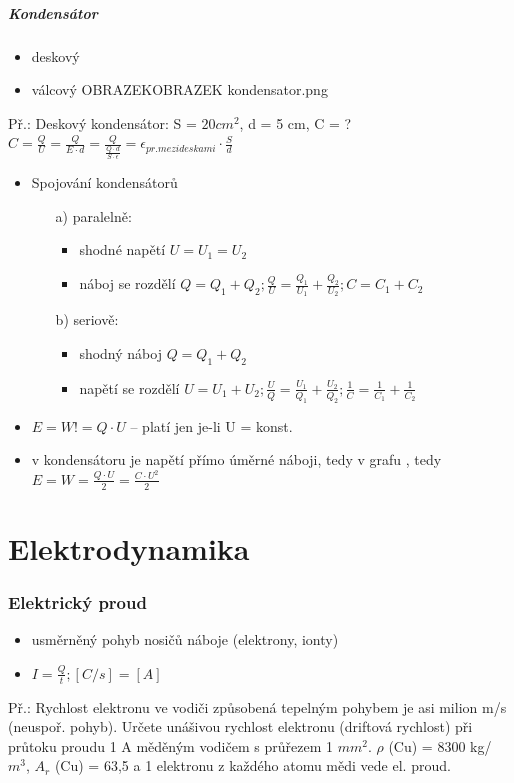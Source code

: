 \documentclass{article}
\begin{document}
\subsubsection{Kondensátor}
\begin{itemize}
  \item deskový
  \item válcový OBRAZEKOBRAZEK kondensator.png
\end{itemize}
Př.: Deskový kondensátor: S = $20 cm^2$, d = 5 cm, C = ?\\
$C = \frac{Q}{U}=\frac{Q}{E\cdot d}=\frac{Q}{\frac{Q\cdot d}{S\cdot \epsilon}} = \epsilon_{pr. mezi deskami} \cdot \frac{S}{d}$
\begin{itemize}
  \item Spojování kondensátorů
  \begin{itemize}
    \item[a)] paralelně:
    \begin{itemize}
      \item shodné napětí $U = U_1 = U_2$
      \item náboj se rozdělí $Q = Q_1 + Q_2; \frac{Q}{U} = \frac{Q_1}{U_1} + \frac{Q_2}{U_2}; C = C_1 + C_2$
    \end{itemize}
    \item[b)] seriově:
    \begin{itemize}
      \item shodný náboj $Q = Q_1 + Q_2$
      \item napětí se rozdělí $U = U_1 + U_2; \frac{U}{Q} = \frac{U_1}{Q_1} + \frac{U_2}{Q_2}; \frac{1}{C} = \frac{1}{C_1} + \frac{1}{C_2}$
    \end{itemize}
  \end{itemize}
  \item $E = W != Q \cdot U$ -- platí jen je-li U = konst.
  \item v kondensátoru je napětí přímo úměrné náboji, tedy v grafu , tedy $E = W = \frac{Q\cdot U}{2} = \frac{C\cdot U^2}{2}$
\end{itemize}

\part{Elektrodynamika}
\section{Elektrický proud}
\begin{itemize}
  \item usměrněný pohyb nosičů náboje (elektrony, ionty)
  \item $I = \frac{Q}{t}; [C/s] = [A]$
\end{itemize}
Př.: Rychlost elektronu ve vodiči způsobená tepelným pohybem je asi milion m/s (neuspoř. pohyb). Určete unášivou rychlost elektronu (driftová rychlost) při průtoku proudu 1 A měděným vodičem s průřezem 1 $mm^2$. $\rho$ (Cu) = 8300 kg/ $m^3$, $A_r$ (Cu) = 63,5 a 1 elektronu z každého atomu mědi vede el. proud.
\end{document}
